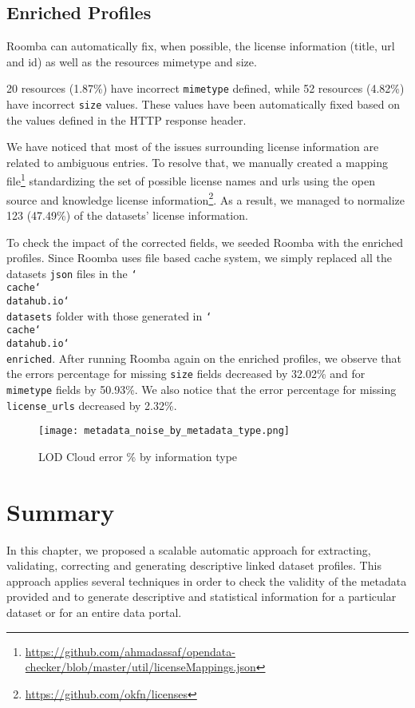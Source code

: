 \subsection{Enriched Profiles}
Roomba can automatically fix, when possible, the license information (title, url and id) as well as the resources mimetype and size.

20 resources (1.87\%) have incorrect \texttt{mimetype} defined, while 52 resources (4.82\%) have incorrect \texttt{size} values. These values have been automatically fixed based on the values defined in the HTTP response header.

We have noticed that most of the issues surrounding license information are related to ambiguous entries. To resolve that, we manually created a mapping file\footnote{\url{https://github.com/ahmadassaf/opendata-checker/blob/master/util/licenseMappings.json}} standardizing the set of possible license names and urls using the open source and knowledge license information\footnote{\url{https://github.com/okfn/licenses}}. As a result, we managed to normalize 123 (47.49\%) of the datasets' license information.

To check the impact of the corrected fields, we seeded Roomba with the enriched profiles. Since Roomba uses file based cache system, we simply replaced all the datasets \texttt{json} files in the \texttt{\char`\\ cache\char`\\ datahub.io\char`\\ datasets} folder with those generated in \texttt{\char`\\ cache\char`\\ datahub.io\char`\\ enriched}. After running Roomba again on the enriched profiles, we observe that the errors percentage for missing \texttt{size} fields decreased by 32.02\% and for \texttt{mimetype} fields by 50.93\%. We also notice that the error percentage for missing \texttt{license\_urls} decreased by 2.32\%.

\begin{figure}[!ht]
  \centering
  \texttt{[image: metadata\_noise\_by\_metadata\_type.png]}
  \caption{LOD Cloud error \% by information type}
  \label{fig:metadata_noise_by_metadata_type}
\end{figure}

\section{Summary}
\label{section:roomba_summary}
In this chapter, we proposed a scalable automatic approach for extracting, validating, correcting and generating descriptive linked dataset profiles. This approach applies several techniques in order to check the validity of the metadata provided and to generate descriptive and statistical information for a particular dataset or for an entire data portal.

